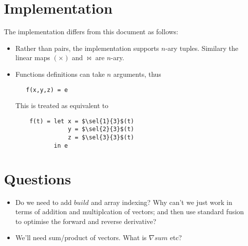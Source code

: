 \documentclass[sigplan,review]{acmart}
\newcommand{\gradf}[1]{\nabla\! \mathit{#1}}  %
\newcommand{\sel}[2]{\pi_{#1,#2}}
\newcommand{\buildfun}{\mathit{build}}
\newcommand{\lmpair}{\times}         %
\newcommand{\lmjoin}{\bowtie}        %
\begin{document}
\section{Implementation}

The implementation differs from this document as follows:
\begin{itemize}
\item Rather than pairs, the implementation supports $n$-ary tuples.
  Similary the linear maps $(\lmpair)$ and $\lmjoin$ are $n$-ary.
\item Functions definitions can take $n$ arguments, thus
  \begin{lstlisting}
   f(x,y,z) = e
  \end{lstlisting}
  This is treated as equivalent to
  \begin{lstlisting}
    f(t) = let x = $\sel{1}{3}$(t)
               y = $\sel{2}{3}$(t)
               z = $\sel{3}{3}$(t)
           in e
  \end{lstlisting}
\end{itemize}

\section{Questions}

\begin{itemize}
\item Do we need to add $\buildfun$ and array indexing?  Why can't we just work in terms of
  addition and multiplcation of vectors; and then use standard fusion to
  optimise the forward and reverse derivative?

\item We'll need sum/product of vectors.  What is $\gradf{sum}$ etc?

\end{itemize}  
\end{document}
